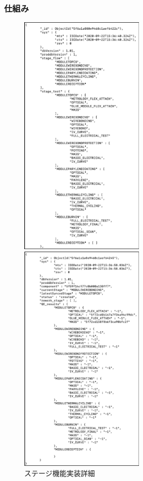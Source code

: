 \subsubsection{仕組み}

\begin{figure}[bpt]
  \begin{center}
  \begin{minipage}{0.4\hsize}
    \includegraphics[width=6cm]{qc_status_doc}
  \end{minipage}
  \begin{minipage}{0.4\hsize}
    \includegraphics[width=6cm]{qc_module_status_doc}
  \end{minipage}
  \caption[ステージ機能実装詳細]{ステージ機能実装詳細}
  \label{Tutorial_picture}
  \end{center}
\end{figure}


